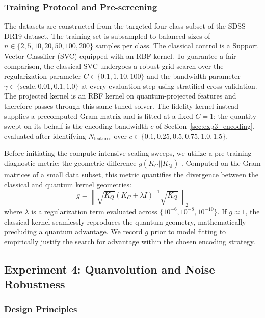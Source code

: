 \subsubsection{Training Protocol and Pre-screening}
\label{sec:exp3_protocol}

The datasets are constructed from the targeted four-class subset of the SDSS DR19 dataset. The training set is subsampled to balanced sizes of $n \in \{2, 5, 10, 20, 50, 100, 200\}$ samples per class. The classical control is a Support Vector Classifier (SVC) equipped with an RBF kernel. To guarantee a fair comparison, the classical SVC undergoes a robust grid search over the regularization parameter $C \in \{0.1, 1, 10, 100\}$ and the bandwidth parameter $\gamma \in \{\text{scale}, 0.01, 0.1, 1.0\}$ at every evaluation step using stratified cross-validation. The projected kernel is an RBF kernel on quantum-projected features and therefore passes through this same tuned solver. The fidelity kernel instead supplies a precomputed Gram matrix and is fitted at a fixed $C = 1$; the quantity swept on its behalf is the encoding bandwidth $c$ of Section~\ref{sec:exp3_encoding}, evaluated after identifying $N_{\text{features}}$ over $c \in \{0.1, 0.25, 0.5, 0.75, 1.0, 1.5\}$.

Before initiating the compute-intensive scaling sweeps, we utilize a pre-training diagnostic metric: the geometric difference $g(K_C || K_Q)$ \cite{huang2021power}. Computed on the Gram matrices of a small data subset, this metric quantifies the divergence between the classical and quantum kernel geometries:
$$ g = \left\| \sqrt{K_Q} (K_C + \lambda I)^{-1} \sqrt{K_Q} \right\|_2 $$
where $\lambda$ is a regularization term evaluated across $\{10^{-6}, 10^{-8}, 10^{-10}\}$. If $g \approx 1$, the classical kernel seamlessly reproduces the quantum geometry, mathematically precluding a quantum advantage. We record $g$ prior to model fitting to empirically justify the search for advantage within the chosen encoding strategy.


\subsection{Experiment 4: Quanvolution and Noise Robustness}
\label{sec:exp4_methods}

\subsubsection{Design Principles}
\label{sec:exp4_philosophy}

